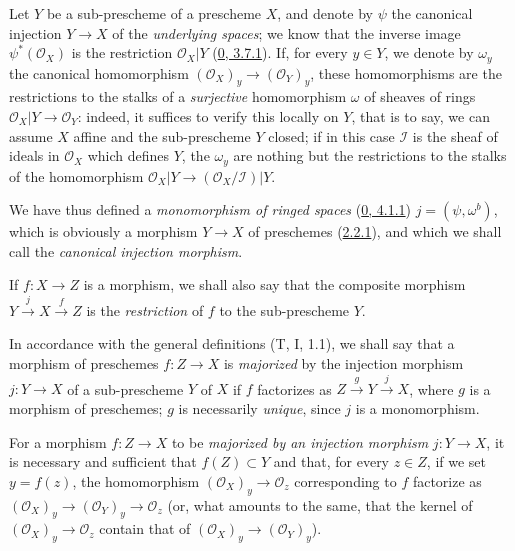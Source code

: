\begin{env}[4.1.7]
\label{I.4.1.7}
Let $Y$ be a sub-prescheme of a prescheme $X$, and denote by $\psi$
the canonical injection $Y\to X$ of the \emph{underlying spaces}; we know that
the inverse image $\psi^*(\mathscr{O}_X)$ is the restriction
$\mathscr{O}_X|Y$ (\hyperref[0.3.7.1]{0, 3.7.1}). If, for every $y\in Y$,
we denote by $\omega_y$ the canonical homomorphism
$(\mathscr{O}_X)_y\to(\mathscr{O}_Y)_y$, these homomorphisms are the
restrictions to the stalks of a \emph{surjective} homomorphism $\omega$ of
sheaves of rings $\mathscr{O}_X|Y\to\mathscr{O}_Y$: indeed, it suffices to
verify this locally on $Y$, that is to say, we can assume $X$
affine and the sub-prescheme $Y$ closed; if in this case $\mathscr{I}$ is the
sheaf of ideals in $\mathscr{O}_X$ which defines $Y$, the $\omega_y$ are
nothing but the restrictions to the stalks of the homomorphism
$\mathscr{O}_X|Y\to(\mathscr{O}_X/\mathscr{I})|Y$.

We have thus defined a \emph{monomorphism of ringed spaces}
(\hyperref[0.4.1.1]{0, 4.1.1}) $j=(\psi,\omega^b)$, which is obviously a
morphism $Y\to X$ of preschemes (\hyperref[I.2.2.1]{2.2.1}), and which we
shall call the \emph{canonical injection morphism}.

If $f:X\to Z$ is a morphism, we shall also say that the composite morphism
$Y\xrightarrow{j}X\xrightarrow{f}Z$ is the \emph{restriction} of $f$ to the
sub-prescheme $Y$.
\end{env}

\begin{env}[4.1.8]
\label{I.4.1.8}
In accordance with the general definitions (T, I, 1.1), we shall say that a
morphism of preschemes $f:Z\to X$ is \emph{majorized} by the injection
morphism $j:Y\to X$ of a sub-prescheme $Y$ of $X$ if $f$ factorizes as
$Z\xrightarrow{g}Y\xrightarrow{j}X$, where $g$ is a morphism of preschemes;
$g$ is necessarily \emph{unique}, since $j$ is a monomorphism.
\end{env}

\begin{proposition}[4.1.9]
\label{I.4.1.9}
For a morphism $f:Z\to X$ to be \emph{majorized by an injection
morphism} $j:Y\to X$, it is necessary and sufficient that $f(Z)\subset Y$
and that, for every $z\in Z$, if we set $y=f(z)$, the homomorphism
$(\mathscr{O}_X)_y\to\mathscr{O}_z$ corresponding to $f$ factorize as
$(\mathscr{O}_X)_y\to(\mathscr{O}_Y)_y\to\mathscr{O}_z$ (or, what amounts
to the same, that the kernel of $(\mathscr{O}_X)_y\to\mathscr{O}_z$ contain
that of $(\mathscr{O}_X)_y\to(\mathscr{O}_Y)_y$).
\end{proposition}

